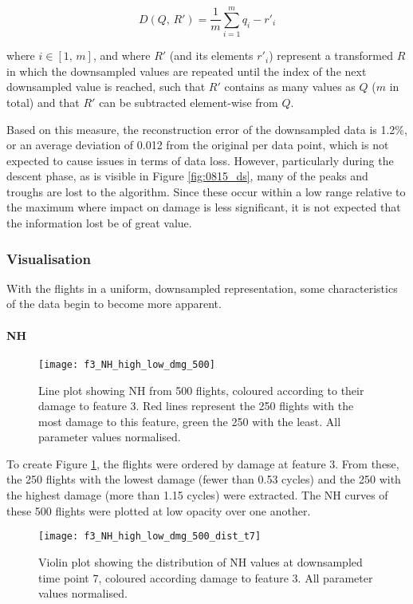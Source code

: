 \[
    D(Q,\,R') = \frac{1}{m}\sum_{i=1}^{m}{q_i - r'_i}
\]

where \(i \in \left[1,\,m\right]\), and where \(R'\) (and its elements \(r'_i\)) represent a transformed \(R\) in which the downsampled values are repeated until the index of the next downsampled value is reached, such that \(R'\) contains as many values as \(Q\) (\(m\) in total) and that \(R'\) can be subtracted element-wise from \(Q\).

Based on this measure, the reconstruction error of the downsampled data is 1.2\%, or an average deviation of 0.012 from the original per data point, which is not expected to cause issues in terms of data loss. However, particularly during the descent phase, as is visible in Figure \ref{fig:0815_ds}, many of the peaks and troughs are lost to the algorithm. Since these occur within a low range relative to the maximum where impact on damage is less significant, it is not expected that the information lost be of great value.

\subsubsection{Visualisation}
With the flights in a uniform, downsampled representation, some characteristics of the data begin to become more apparent.

\paragraph{NH}
\begin{figure}
    \centering
    \texttt{[image: f3\_NH\_high\_low\_dmg\_500]}
    \caption{\label{fig:high_low_dmg_NH} Line plot showing NH from 500 flights, coloured according to their damage to feature 3. Red lines represent the 250 flights with the most damage to this feature, green the 250 with the least. All parameter values normalised.}
\end{figure}

To create Figure \ref{fig:high_low_dmg_NH}, the flights were ordered by damage at feature 3. From these, the 250 flights with the lowest damage (fewer than 0.53 cycles) and the 250 with the highest damage (more than 1.15 cycles) were extracted. The NH curves of these 500 flights were plotted at low opacity over one another.

\begin{figure}
    \centering
    \texttt{[image: f3\_NH\_high\_low\_dmg\_500\_dist\_t7]}
    \caption{\label{fig:dmg_violin_NH} Violin plot showing the distribution of NH values at downsampled time point 7, coloured according damage to feature 3. All parameter values normalised.}
\end{figure}

